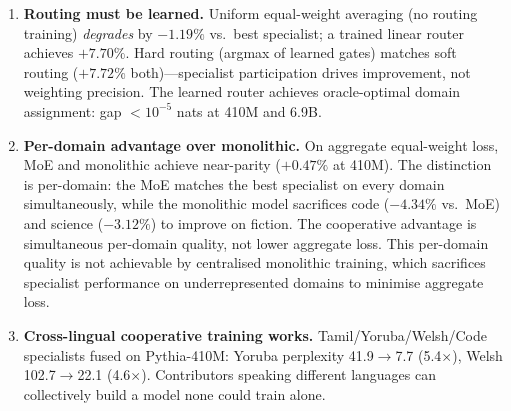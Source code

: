 \documentclass{article}
\begin{document}
\begin{enumerate}[leftmargin=*, itemsep=2pt]
  \item \textbf{Routing must be learned.} Uniform equal-weight averaging (no routing training) \emph{degrades} by $-1.19\%$ vs.\ best specialist; a trained linear router achieves $+7.70\%$. Hard routing (argmax of learned gates) matches soft routing ($+7.72\%$ both)---specialist participation drives improvement, not weighting precision. The learned router achieves oracle-optimal domain assignment: gap ${<}10^{-5}$ nats at 410M and 6.9B.
  \item \textbf{Per-domain advantage over monolithic.} On aggregate equal-weight loss, MoE and monolithic achieve near-parity ($+0.47\%$ at 410M). The distinction is per-domain: the MoE matches the best specialist on every domain simultaneously, while the monolithic model sacrifices code ($-4.34\%$ vs.\ MoE) and science ($-3.12\%$) to improve on fiction. The cooperative advantage is simultaneous per-domain quality, not lower aggregate loss. This per-domain quality is not achievable by centralised monolithic training, which sacrifices specialist performance on underrepresented domains to minimise aggregate loss.
  \item \textbf{Cross-lingual cooperative training works.} Tamil/Yoruba/Welsh/Code specialists fused on Pythia-410M: Yoruba perplexity 41.9$\to$7.7 (5.4$\times$), Welsh 102.7$\to$22.1 (4.6$\times$). Contributors speaking different languages can collectively build a model none could train alone.
\end{enumerate}
\end{document}

